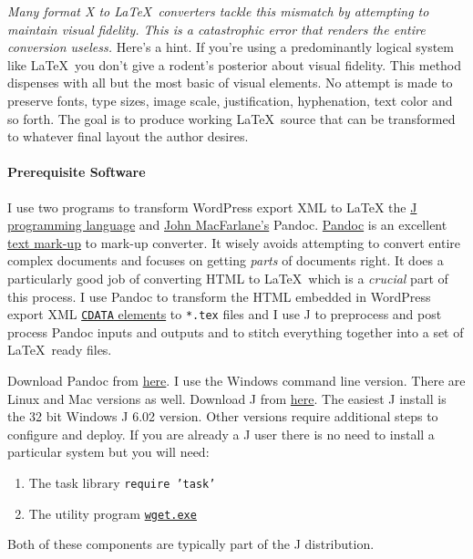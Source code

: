 \emph{Many format X to \LaTeX\ converters tackle this mismatch by
attempting to maintain visual fidelity. This is a catastrophic error
that renders the entire conversion useless.} Here's a hint. If you're
using a predominantly logical system like \LaTeX\ you don't give a
rodent's posterior about visual fidelity. This method dispenses with all
but the most basic of visual elements. No attempt is made to preserve
fonts, type sizes, image scale, justification, hyphenation, text color
and so forth. The goal is to produce working \LaTeX\ source that can be
transformed to whatever final layout the author desires.

\paragraph{Prerequisite Software}

I use two programs to transform WordPress export XML to \LaTeX\: the
\href{http://www.jsoftware.com/}{J programming language} and
\href{http://johnmacfarlane.net/}{John MacFarlane's} Pandoc.
\href{http://johnmacfarlane.net/pandoc/}{Pandoc} is an excellent
\href{http://en.wikipedia.org/wiki/Markup\_language}{text mark-up} to
mark-up converter. It wisely avoids attempting to convert entire complex
documents and focuses on getting \emph{parts} of documents right. It
does a particularly good job of converting HTML to \LaTeX\ which is a
\emph{crucial} part of this process. I use Pandoc to transform the HTML
embedded in WordPress export XML
\href{http://en.wikipedia.org/wiki/CDATA}{\texttt{CDATA} elements} to
\texttt{*.tex} files and I use J to preprocess and post process Pandoc
inputs and outputs and to stitch everything together into a set of \LaTeX\
ready files.

Download Pandoc from
\href{http://johnmacfarlane.net/pandoc/installing.html}{here}. I use the
Windows command line version. There are Linux and Mac versions as well.
Download J from \href{http://www.jsoftware.com/stable.htm}{here}. The
easiest J install is the 32 bit Windows J 6.02 version. Other versions
require additional steps to configure and deploy. If you are already a J
user there is no need to install a particular system but you will need:

\begin{enumerate}
\tightlist
\item
  The task library \texttt{require 'task'}
\item
  The utility program
  \href{http://www.gnu.org/software/wget/}{\texttt{wget.exe}}
\end{enumerate}
Both of these components are typically part of the J distribution.


